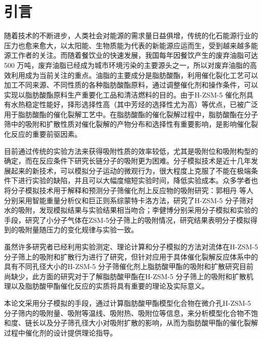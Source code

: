 \section{引言}
\par{随着技术的不断进步，人类社会对能源的需求量日益俱增，传统的化石能源行业的压力也愈来愈大，以太阳能、生物质能为代表的新能源应运而生，受到越来越多能源工作者的关注。而随着餐饮业的快速发展，我国每年因餐饮产生的废弃油脂可达500 万吨\cite{2014我国餐厨废油资源化利用现状及展望,马冰2015油脂催化转化为绿色燃料的技术进展}，废弃油脂已经成为城市环境污染的主要源头之一，所以对废弃油脂的高效利用成为当前关注的重点。油脂的主要成分是脂肪酸酯，利用催化裂化工艺可以加工不同来源、不同性质的各种脂肪酸酯原料，通过调整催化剂和操作条件，可以实现以脂肪酸酯原料生产重要化工品和清洁燃料的目的\cite{脂肪酸酯的催化裂化研究}。由于H-ZSM-5 催化剂具有水热稳定性能好，择形选择性高（其中芳烃的选择性尤为高）等优点，已被广泛用于脂肪酸酯的催化裂解工艺中。在脂肪酸酯的催化裂解过程中，脂肪酸酯在分子筛中的吸附和扩散性质对催化裂解的产物分布和选择性有重要影响\cite{闫昊2017基于结构导向集总的废弃油脂催化裂化分子尺度动力学模型}，是影响催化裂化反应的重要前驱因素。}
\par{目前通过传统的实验方法来获得吸附性质的效率较低，尤其是吸附位和吸附构型的确定，而在反应条件下研究长链分子的吸附更为困难。分子模拟技术是近十几年发展起来的新技术，可以模拟分子运动的微观行为，很大程度上克服了不能在极端条件下进行实验的缺陷，并且可以大幅度缩短实验时间，降低实验成本。众多学者也将分子模拟技术用于解释和预测分子筛催化剂上反应物的吸附研究：郭相丹\cite{2006Investigation} 等人分别采用智能重量分析仪和巨正则系综蒙特卡洛方法，研究了H-ZSM-5 分子筛对水的吸附，发现模拟结果与实验结果相当吻合；李健博\cite{几种气体在ZSM-5分子筛上吸附的模拟与实验研究}分别采用分子模拟和实验的手段，研究了小分子气体在ZSM-5分子筛上的吸附情况，研究结果表明分子模拟得到的吸附量随压力的变化规律与实验一致。}
\par{虽然许多研究者已经利用实验测定、理论计算和分子模拟的方法对流体在H-ZSM-5 分子筛上的吸附和扩散行为进行了研究，但针对应用于具体催化裂解反应体系中的具有不同孔径大小的H-ZSM-5 分子筛催化剂上脂肪酸甲酯的吸附和扩散研究目前尚缺少，此方面的研究对于了解脂肪酸甲酯在H-ZSM-5 分子筛上的吸附和扩散机理以及脂肪酸甲酯催化反应的实质将具有重要的理论及实际意义。}
\par{本论文采用分子模拟的手段，通过计算脂肪酸甲酯模型化合物在微介孔H-ZSM-5 分子筛内的吸附量、吸附等温线、吸附热、吸附位等信息，来分析模型化合物不饱和度、链长以及分子筛孔径大小对吸附扩散的影响，从而为脂肪酸甲酯的催化裂解过程中催化剂的设计提供理论指导。}
